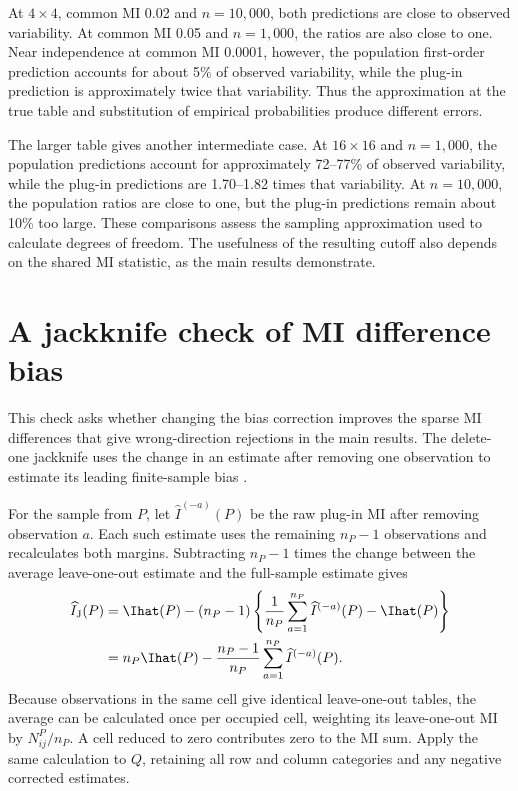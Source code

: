 \begin{table}[H]
\centering
\small
\caption{Predicted and observed variability of the estimated MI variance.}
\label{tab:variance-stability}

\end{table}

At \(4\times4\), common MI 0.02 and \(n=10{,}000\), both
predictions are close to observed variability. At common MI 0.05 and
\(n=1{,}000\), the ratios are also close to one. Near independence
at common MI 0.0001, however, the population first-order prediction
accounts for about 5\% of observed variability, while the plug-in
prediction is approximately twice that variability. Thus the
approximation at the true table and substitution of empirical
probabilities produce different errors.

The larger table gives another intermediate case. At \(16\times16\)
and \(n=1{,}000\), the population predictions account for approximately
72--77\% of observed variability, while the plug-in predictions are
1.70--1.82 times that variability. At \(n=10{,}000\), the population
ratios are close to one, but the plug-in predictions remain about 10\%
too large. These comparisons assess the sampling approximation used to
calculate degrees of freedom. The usefulness of the resulting cutoff
also depends on the shared MI statistic, as the main results demonstrate.

\section{A jackknife check of MI difference bias}
\label{sec:jackknife-difference-check}

This check asks whether changing the bias correction improves the sparse
MI differences that give wrong-direction rejections in the main results.
The delete-one jackknife uses the change in an estimate after removing
one observation to estimate its leading finite-sample bias
\citep[Section~3]{paninski2003}.

For the sample from \(P\), let
\(\widehat I^{(-a)}(P)\) be the raw plug-in MI after removing observation
\(a\). Each such estimate uses the remaining \(n_P-1\) observations and
recalculates both margins. Subtracting \(n_P-1\) times the change between
the average leave-one-out estimate and the full-sample estimate gives
\begin{align}
 \widehat I_{\mathrm J}(P)
 &=\Ihat(P)-(n_P-1)
 \left\{\frac{1}{n_P}\sum_{a=1}^{n_P}\widehat I^{(-a)}(P)-\Ihat(P)\right\}
 \notag\\
 &=n_P\Ihat(P)-\frac{n_P-1}{n_P}
 \sum_{a=1}^{n_P}\widehat I^{(-a)}(P).
 \label{eq:jackknife-mi-check}
\end{align}
Because observations in the same cell give identical leave-one-out tables,
the average can be calculated once per occupied cell, weighting its
leave-one-out MI by \(N^P_{ij}/n_P\). A cell reduced to zero contributes
zero to the MI sum. Apply the same calculation to \(Q\), retaining
all row and column categories and any negative corrected estimates.

